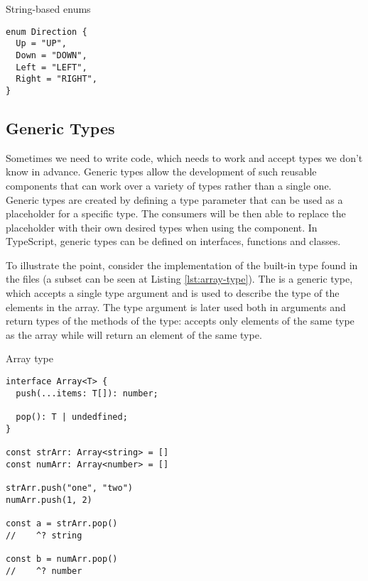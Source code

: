 \begin{listing}[h]
  \caption{String-based enums}\label{lst:string-based-enums}
  \begin{verbatim}
enum Direction {
  Up = "UP",
  Down = "DOWN",
  Left = "LEFT",
  Right = "RIGHT",
}
\end{verbatim}
\end{listing}

\subsection{Generic Types}

Sometimes we need to write code, which needs to work and accept types we don't know in advance. Generic types allow the development of such reusable components that can work over a variety of types rather than a single one. Generic types are created by defining a type parameter that can be used as a placeholder for a specific type. The consumers will be then able to replace the placeholder with their own desired types when using the component. In TypeScript, generic types can be defined on interfaces, functions and classes.

To illustrate the point, consider the implementation of the built-in  type found in the  files (a subset can be seen at Listing \ref{lst:array-type}). The  is a generic type, which accepts a single type argument  and is used to describe the type of the elements in the array. The type argument  is later used both in arguments and return types of the methods of the  type:  accepts only elements of the same type as the array while  will return an element of the same type.

\begin{listing}[h]
  \caption{Array type}\label{lst:array-type}
  \begin{verbatim}
interface Array<T> {
  push(...items: T[]): number;

  pop(): T | undedfined;
}

const strArr: Array<string> = []
const numArr: Array<number> = []

strArr.push("one", "two")
numArr.push(1, 2)

const a = strArr.pop()
//    ^? string

const b = numArr.pop()
//    ^? number
\end{verbatim}
\end{listing}

